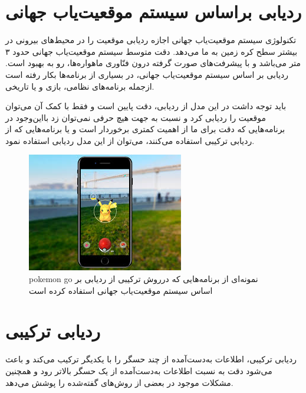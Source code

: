 \section{ردیابی براساس سیستم موقعیت‌یاب جهانی \protect{}}
تکنولوژی سیستم موقعیت‌یاب جهانی اجازه ردیابی موقعیت را در محیط‌های بیرونی در بیشتر سطح کره زمین به ما می‌دهد. دقت متوسط سیستم موقعیت‌یاب جهانی حدود ۳ متر می‌باشد و با پیشرفت‌های صورت گرفته درون فنّاوری ماهواره‌ها، رو به بهبود است.
ردیابی بر اساس سیستم موقعیت‌یاب جهانی، در بسیاری از برنامه‌ها بکار رفته است ازجمله برنامه‌های نظامی، بازی و یا تاریخی. 

باید توجه داشت در این مدل از ردیابی، دقت پایین است و فقط با کمک آن می‌توان موقعیت را ردیابی کرد و نسبت به جهت هیچ حرفی نمی‌توان زد بااین‌وجود در برنامه‌هایی که دقت برای ما از اهمیت کمتری برخوردار است و یا برنامه‌هایی که از ردیابی ترکیبی استفاده می‌کنند، می‌توان از این مدل ردیابی استفاده نمود.
\begin{figure}
	\centering
	\includegraphics[width=1\linewidth]{image/pokemongo}
	\caption {pokemon go نمونه‌ای از برنامه‌هایی که درروش ترکیبی از ردیابی بر اساس سیستم موقعیت‌یاب جهانی استفاده کرده است    \cite{pokemongo}}
	\label{fig:pokemongo}
\end{figure}

\section{ردیابی ترکیبی \protect{}}
ردیابی ترکیبی، اطلاعات به‌دست‌آمده از چند حسگر را با یکدیگر ترکیب می‌کند و باعث می‌شود دقت به نسبت اطلاعات به‌دست‌آمده از یک حسگر بالاتر رود و همچنین مشکلات موجود در بعضی از روش‌های گفته‌شده را پوشش می‌دهد.

